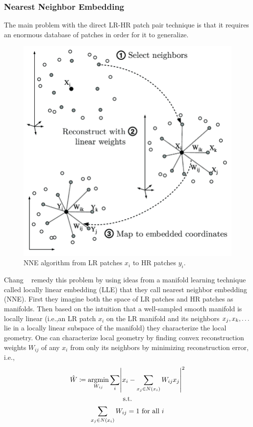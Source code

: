 \subsubsection{Nearest Neighbor Embedding}
The main problem with the direct LR-HR patch pair technique is that it requires an enormous database of patches in order for it to generalize.
%
\begin{figure}
	\centering
	\includegraphics[width=\linewidth,keepaspectratio]{figures/classical/lle.png}
	\caption{NNE algorithm from LR patches \(x_i\) to HR patches \(y_i\)\cite{Guillermophdthesis}.}
	\label{fig:lle}
\end{figure}
Chang \etal~ remedy this problem by using ideas from a manifold learning technique called locally linear embedding\cite{saul2000introduction} (LLE) that they call nearest neighbor embedding (NNE).
%
First they imagine both the space of LR patches and HR patches as manifolds.
%
Then based on the intuition that a well-sampled smooth manifold is locally linear (i.e.,an LR patch \(x_i\) on the LR manifold and its neighbors \(x_j, x_k, \mathellipsis\) lie in a locally linear subspace of the manifold) they characterize the local geometry.
%
One can characterize local geometry by finding convex reconstruction weights \(W_{ij}\) of any \(x_i\) from only its neighbors by minimizing reconstruction error, i.e.,\begin{gather}
	\hat{W} \coloneqq \underset{W_{ij}}{\text{argmin}} \sum_i \abs{ x_i - \sum_{x_j \in N(x_i)} W_{ij} x_j  }^2 \nonumber \\
	\text{s.t.} \\
	\sum_{x_j \in N(x_i)} W_{ij} = 1 \text{ for all }i \nonumber
\end{gather}
